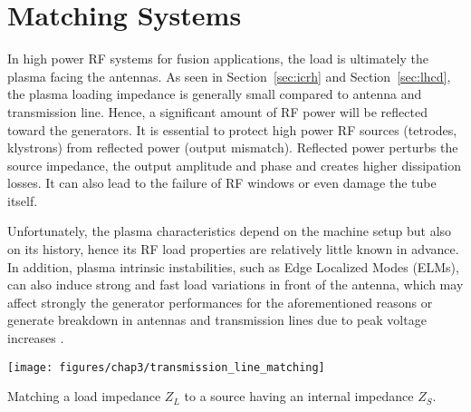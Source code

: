 \section{Matching Systems}\label{sec:matching_systems}
In high power RF systems for fusion applications, the load is ultimately the plasma facing the antennas. As seen in Section~\ref{sec:icrh} and Section~\ref{sec:lhcd}, the plasma loading impedance is generally small compared to antenna and transmission line. Hence, a significant amount of RF power will be reflected toward the generators. It is essential to protect high power RF sources (tetrodes, klystrons) from reflected power (output mismatch). Reflected power perturbs the source impedance, the output amplitude and phase and creates higher dissipation losses. It can also lead to the failure of RF windows  or even damage the tube itself. 

Unfortunately, the plasma characteristics depend on the machine setup but also on its history, hence its RF load properties are relatively little known in advance. In addition, plasma intrinsic instabilities, such as Edge Localized Modes (ELMs), can also induce strong and fast load variations in front of the antenna, which may affect strongly the generator performances for the aforementioned reasons or generate breakdown in antennas and transmission lines due to peak voltage increases . 

\begin{marginfigure}[*+5]
	\texttt{[image: figures/chap3/transmission\_line\_matching]}
	\caption{Matching a load impedance $Z_L$ to a source having an internal impedance $Z_S$.}
	\label{fig:transmission_matching}
\end{marginfigure}

